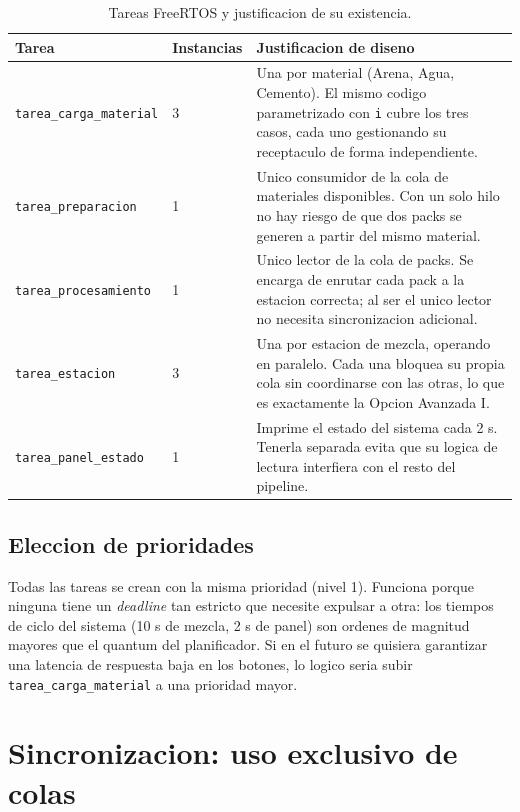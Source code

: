 \documentclass[12pt,a4paper]{article}
\begin{document}
\begin{table}[h!]
\caption{Tareas FreeRTOS y justificacion de su existencia.}\label{tab:tareas}
\begin{tabularx}{\linewidth}{%
  >{\raggedright\arraybackslash\footnotesize}p{4.2cm}%
  >{\centering\arraybackslash\footnotesize}p{1.8cm}%
  >{\raggedright\arraybackslash\footnotesize}X}
\toprule
Tarea & Instancias & Justificacion de diseno \\
\midrule
\texttt{tarea\_carga\_material} & 3 & Una por material (Arena, Agua, Cemento). El mismo codigo parametrizado con \texttt{i} cubre los tres casos, cada uno gestionando su receptaculo de forma independiente. \\[4pt]
\texttt{tarea\_preparacion} & 1 & Unico consumidor de la cola de materiales disponibles. Con un solo hilo no hay riesgo de que dos packs se generen a partir del mismo material. \\[4pt]
\texttt{tarea\_procesamiento} & 1 & Unico lector de la cola de packs. Se encarga de enrutar cada pack a la estacion correcta; al ser el unico lector no necesita sincronizacion adicional. \\[4pt]
\texttt{tarea\_estacion} & 3 & Una por estacion de mezcla, operando en paralelo. Cada una bloquea su propia cola sin coordinarse con las otras, lo que es exactamente la Opcion Avanzada I. \\[4pt]
\texttt{tarea\_panel\_estado} & 1 & Imprime el estado del sistema cada 2 s. Tenerla separada evita que su logica de lectura interfiera con el resto del pipeline. \\
\bottomrule
\end{tabularx}
\end{table}

\subsection{Eleccion de prioridades}

Todas las tareas se crean con la misma prioridad (nivel 1). Funciona porque ninguna tiene un \textit{deadline} tan estricto que necesite expulsar a otra: los tiempos de ciclo del sistema (10 s de mezcla, 2 s de panel) son ordenes de magnitud mayores que el quantum del planificador. Si en el futuro se quisiera garantizar una latencia de respuesta baja en los botones, lo logico seria subir \texttt{tarea\_carga\_material} a una prioridad mayor.

\section{Sincronizacion: uso exclusivo de colas}
\end{document}
